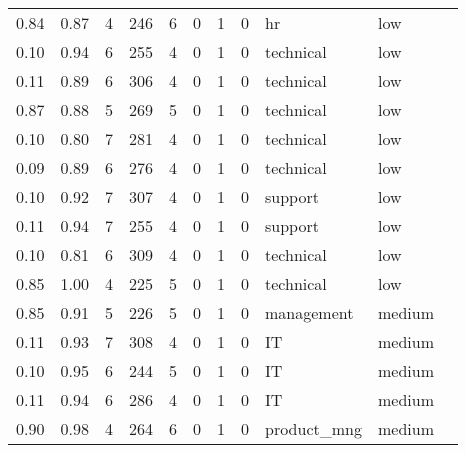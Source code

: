 \documentclass[11pt]{article}
\begin{document}
\begin{tabular}{r|llllllllll}
	 0.84        & 0.87        & 4           & 246         & 6           & 0           & 1           & 0           & hr          & low        \\
	 0.10        & 0.94        & 6           & 255         & 4           & 0           & 1           & 0           & technical   & low        \\
	 0.11        & 0.89        & 6           & 306         & 4           & 0           & 1           & 0           & technical   & low        \\
	 0.87        & 0.88        & 5           & 269         & 5           & 0           & 1           & 0           & technical   & low        \\
	 0.10        & 0.80        & 7           & 281         & 4           & 0           & 1           & 0           & technical   & low        \\
	 0.09        & 0.89        & 6           & 276         & 4           & 0           & 1           & 0           & technical   & low        \\
	 0.10        & 0.92        & 7           & 307         & 4           & 0           & 1           & 0           & support     & low        \\
	 0.11        & 0.94        & 7           & 255         & 4           & 0           & 1           & 0           & support     & low        \\
	 0.10        & 0.81        & 6           & 309         & 4           & 0           & 1           & 0           & technical   & low        \\
	 0.85        & 1.00        & 4           & 225         & 5           & 0           & 1           & 0           & technical   & low        \\
	 0.85        & 0.91        & 5           & 226         & 5           & 0           & 1           & 0           & management  & medium     \\
	 0.11        & 0.93        & 7           & 308         & 4           & 0           & 1           & 0           & IT          & medium     \\
	 0.10        & 0.95        & 6           & 244         & 5           & 0           & 1           & 0           & IT          & medium     \\
	 0.11        & 0.94        & 6           & 286         & 4           & 0           & 1           & 0           & IT          & medium     \\
	 0.90          & 0.98          & 4             & 264           & 6             & 0             & 1             & 0             & product\_mng & medium       \\

\end{tabular}
\end{document}

